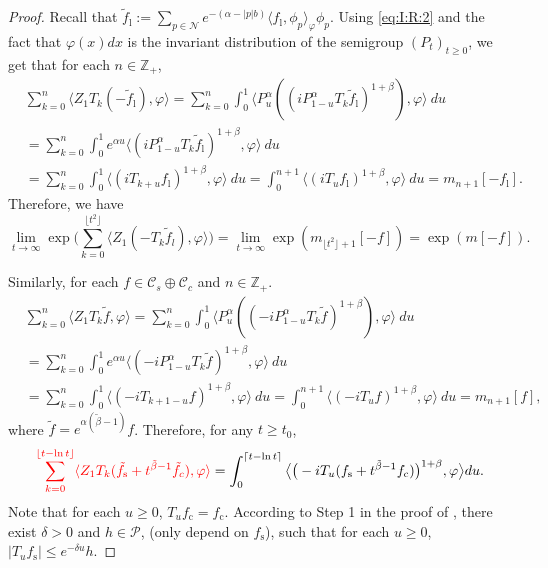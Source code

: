 \documentclass[12pt,a4paper]{amsart}
\theoremstyle{plain}
\theoremstyle{definition}
\numberwithin{equation}{section}
\begin{document}
\begin{proof}
 Recall that  $\tilde f_\mathrm l := \sum_{p\in \mathcal N} e^{-(\alpha - |p|b)}\langle f_\mathrm l, \phi_p \rangle_\varphi \phi_p$.
  Using \eqref{eq:I:R:2} and the fact that $\varphi(x)dx$ is the invariant distribution of the semigroup $(P_t)_{t\geq 0}$, we get that for each $n\in \mathbb Z_+$,
  \begin{align}
    \label{eq:PM:CLTS:2a}
    & \sum_{k=0}^n \langle Z_1 T_{k} (-\tilde f_\mathrm l), \varphi \rangle
      = \sum_{k=0}^n \int_0^1 \langle P_u^\alpha ((iP_{1 - u}^\alpha T_k \tilde f_\mathrm l)^{1+\beta}), \varphi\rangle ~du
    \\& = \sum_{k=0}^n \int_0^1 e^{\alpha u} \langle  (iP_{1 - u}^\alpha T_{k}\tilde f_\mathrm l)^{1+\beta}, \varphi \rangle ~du
    \\& = \sum_{k=0}^n \int_0^1 \langle  (iT_{k+ u} f_\mathrm l)^{1+\beta}, \varphi\rangle~du
    = \int_0^{n+1} \langle  (iT_{u} f_\mathrm l)^{1+\beta}, \varphi\rangle~du = m_{n+1}[-f_\mathrm l].
  \end{align}
Therefore, we have
\[
\lim_{t\rightarrow \infty}\exp\Big(\sum_{k=0}^{\lfloor t^2 \rfloor}\langle Z_1(-T_k\tilde{f}_l),\varphi\rangle\Big) = \lim_{t\rightarrow \infty}\exp(m_{\lfloor t^2 \rfloor+1}[-f])=\exp(m[-f]).
\]

Similarly, for each $f\in \mathcal C_s  \oplus \mathcal C_c$ and $n\in \mathbb Z_+$.
  \begin{align}
    & \sum_{k=0}^n \langle Z_1 T_{k} \tilde f, \varphi \rangle
    = \sum_{k=0}^n \int_0^1 \langle P_u^\alpha ((-iP_{1 - u}^\alpha T_k \tilde f)^{1+\beta}), \varphi\rangle ~du
    \\& = \sum_{k=0}^n \int_0^1 e^{\alpha u} \langle  (-iP_{1 - u}^\alpha T_{k}\tilde f)^{1+\beta}, \varphi \rangle ~du
    \\& = \sum_{k=0}^n \int_0^1 \langle  (-iT_{k+1 - u} f)^{1+\beta}, \varphi\rangle~du
    = \int_0^{n+1} \langle  (-iT_{u} f)^{1+\beta}, \varphi\rangle~du = m_{n+1}[f],
  \end{align}
where $\tilde f=e^{\alpha(\tilde \beta - 1)} f$.
Therefore, for any $t\geq t_0$,
\[
{\color{red}\sum_{k=0}^{\lfloor t-\ln t \rfloor} \langle Z_1T_{k}(\tilde f_\mathrm s+t^{\tilde{\beta}-1}\tilde{f}_c), \varphi\rangle }
=\int_0^{\lceil t-\ln t \rceil}\big\langle \big(-iT_u(f_\mathrm s+t^{\tilde{\beta}-1}f_\mathrm c)\big)^{1+\beta},\varphi \big\rangle du.
\]
Note that for each {\color{red}$u\geq 0$}, $T_uf_\mathrm c=f_\mathrm c$. 
According to Step 1 in the proof of \cite[Lemma 2.6]{RenSongSunZhao2019Stable}, {\color{red}there exist $\delta> 0$ and $h\in \mathcal P$, (only depend on $f_\mathrm s$), such that for each $u\geq 0$,}
 $|T_uf_\mathrm s|\leq e^{-\delta u}h$. 


\end{proof}
\end{document}
